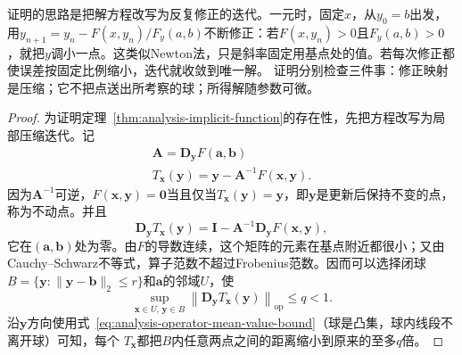 证明的思路是把解方程改写为反复修正的迭代。一元时，固定$x$，从$y_0=b$出发，用$y_{n+1}=y_n-F(x,y_n)/F_y(a,b)$不断修正：若$F(x,y_n)>0$且$F_y(a,b)>0$，就把$y$调小一点。这类似Newton法，只是斜率固定用基点处的值。若每次修正都使误差按固定比例缩小，迭代就收敛到唯一解。
证明分别检查三件事：修正映射是压缩；它不把点送出所考察的球；所得解随参数可微。
\begin{proof}
为证明定理~\ref{thm:analysis-implicit-function}的存在性，先把方程改写为局部压缩迭代。记
\[
 \begin{gathered}
\bm{A}=\bm{D}_{\bm{y}}F(\bm{a},\bm{b})\\
T_{\bm{x}}(\bm{y})=\bm{y}-\bm{A}^{-1}F(\bm{x},\bm{y}).
 \end{gathered}
\]
因为$\bm A^{-1}$可逆，$F(\bm{x},\bm{y})=\bm{0}$当且仅当$T_{\bm{x}}(\bm{y})=\bm{y}$，即$\bm y$是更新后保持不变的点，称为不动点。并且
\[
 \bm{D}_{\bm{y}}T_{\bm{x}}(\bm{y})=\bm{I}-\bm{A}^{-1}\bm{D}_{\bm{y}}F(\bm{x},\bm{y}),
\]
它在$(\bm{a},\bm{b})$处为零。由$F$的导数连续，这个矩阵的元素在基点附近都很小；又由Cauchy--Schwarz不等式，算子范数不超过Frobenius范数。因而可以选择闭球$B=\{\bm{y}:\lVert\bm{y}-\bm{b}\rVert_2\leq r\}$和$\bm{a}$的邻域$U$，使
\begin{equation}
  \sup_{\bm{x}\in U,\,\bm{y}\in B}
  \left\lVert
    \bm{D}_{\bm{y}}T_{\bm{x}}(\bm{y})
  \right\rVert_{\mathrm{op}}
  \leq q<1.
\label{eq:analysis-ift-uniform-contraction}
\end{equation}
沿$\bm{y}$方向使用式~\eqref{eq:analysis-operator-mean-value-bound}（球是凸集，球内线段不离开球）可知，每个
$T_{\bm{x}}$都把$B$内任意两点之间的距离缩小到原来的至多$q$倍。


\end{proof}
